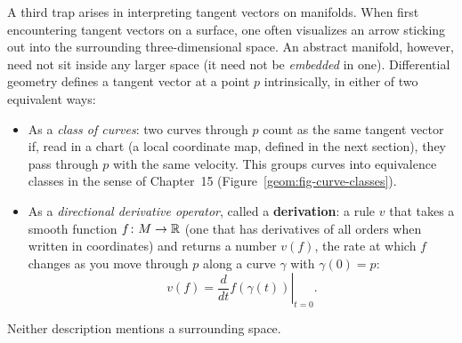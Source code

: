 A third trap arises in interpreting tangent vectors on manifolds. When first encountering tangent vectors on a surface, one often visualizes an arrow sticking out into the surrounding three-dimensional space. An abstract manifold, however, need not sit inside any larger space (it need not be \emph{embedded} in one). Differential geometry defines a tangent vector at a point $p$ intrinsically, in either of two equivalent ways:
\begin{itemize}
  \item As a \emph{class of curves}: two curves through $p$ count as the same tangent vector if, read in a chart (a local coordinate map, defined in the next section), they pass through $p$ with the same velocity. This groups curves into equivalence classes in the sense of Chapter~15 (Figure~\ref{geom:fig-curve-classes}).
  \item As a \emph{directional derivative operator}, called a \textbf{derivation}: a rule $v$ that takes a smooth function $f \colon M \to \mathbb{R}$ (one that has derivatives of all orders when written in coordinates) and returns a number $v(f)$, the rate at which $f$ changes as you move through $p$ along a curve $\gamma$ with $\gamma(0) = p$:
  \[
  v(f) = \left.\frac{d}{dt} f(\gamma(t))\right|_{t=0}.
  \]
\end{itemize}
Neither description mentions a surrounding space.


